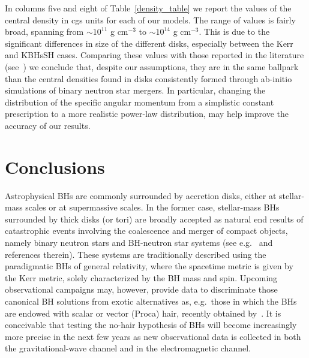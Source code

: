 \documentclass[twocolumn,aps,showpacs,showkeys,prd,superscriptaddress,byrevtex, amsmath]{revtex4-1}
\begin{document}
In columns five and eight of Table~\ref{density_table} we report the values of the central density in cgs units for each of our models. The range of values is fairly broad, spanning from $\sim 10^{11}$ g cm$^{-3}$ to $\sim 10^{14}$ g cm$^{-3}$. This is due to the significant differences in size of the different disks, especially between the Kerr and KBHsSH cases.
Comparing these values with those reported in the literature (see~\cite{Rezzolla:2010,Rezzolla:2017}) we conclude that, despite our assumptions, they are in the same ballpark than the central densities found in disks consistently formed through ab-initio simulations of binary neutron star mergers. In particular, changing the distribution of the specific angular momentum from a simplistic constant prescription to a more realistic power-law distribution,  may help improve the accuracy of our results.


\section{Conclusions}
\label{conclusions}

Astrophysical BHs are commonly surrounded by accretion disks, either at stellar-mass scales or at supermassive scales. In the former case, stellar-mass BHs surrounded by thick disks (or tori) are broadly accepted as natural end results of catastrophic events involving the coalescence and merger of compact objects, namely binary neutron stars and BH-neutron star systems (see e.g.~\cite{FaberRasio2012,Paschalidis:2016agf,Rezzolla:2017} and references therein). These systems are traditionally described using the paradigmatic BHs of general relativity, where the spacetime metric is given by the Kerr metric, solely characterized by the BH mass and spin. Upcoming observational campaigns may, however, provide data to discriminate those canonical BH solutions from exotic alternatives as, e.g.~those in which the BHs are endowed with scalar or vector (Proca) hair, recently obtained by~\cite{Herdeiro:2014a,Herdeiro:2016}. It is conceivable that testing the no-hair hypothesis of BHs will become increasingly more precise in the next few years as new observational data is collected in both the gravitational-wave channel and in the electromagnetic channel.
\end{document}
